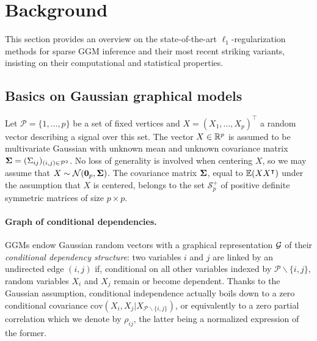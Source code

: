 \section{Background}
\label{sec:chap2:background}

This section provides an overview on the state-of-the-art
$\ell_1$-regularization methods for sparse GGM inference and their
most recent striking variants, insisting on their computational and
statistical properties.%

\subsection{Basics on Gaussian graphical models}
\label{sec:chap2:background:ggm}

Let  $\mathcal{P}=\{1,\dots,p\}$  be  a  set  of  fixed  vertices  and
$X=(X_1,\dots,X_p)^\intercal$ a random vector describing a signal over
this set.   The vector  $X\in \mathbb{R}^p$ is  assumed to  be multivariate
Gaussian  with unknown  mean and  unknown covariance  matrix ${\boldsymbol\Sigma}  =
(\Sigma_{ij})_{(i,j)\in\mathcal{P}^2}$.   No  loss  of  generality  is
involved    when   centering    $X$,   so    we   may    assume   that
$X\sim\mathcal{N}(\mathbf{0}_p,{\boldsymbol\Sigma})$. The covariance matrix ${\boldsymbol\Sigma}$, equal
to  $\mathbb{E}(XX^\intercal)$  under the  assumption  that  $X$ is  centered,
belongs to the set  $\mathcal{S}_{p}^+$ of positive definite symmetric
matrices of size $p\times p$.

\paragraph*{Graph of  conditional dependencies.}  GGMs  endow Gaussian
random  vectors  with a  graphical  representation  $\mathcal{G}$ of  their
\emph{conditional dependency structure}: two variables $i$ and $j$ are
linked  by an  undirected edge  $(i,j)$ if,  conditional on  all other
variables   indexed  by   $\mathcal{P}  \backslash   \{i,j\}$,  random
variables $X_i$ and  $X_j$ remain or become dependent.   Thanks to the
Gaussian assumption, conditional independence actually boils down to a
zero  conditional  covariance $\textrm{cov}(X_i,X_j  |  X_{\mathcal{P}
  \backslash \{i,j\}})$, or equivalently to a zero partial correlation
which  we  denote  by  $\rho_{ij}$,  the  latter  being  a  normalized
expression of the former.


